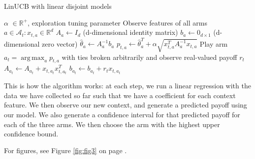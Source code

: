 \documentclass[nojss]{jss}\usepackage[]{graphicx}\usepackage[]{color}
\DeclareMathOperator*{\argmax}{arg\,max}
\begin{document}
\begin{algorithm}
\caption{LinUCB with linear disjoint models}
\label{Alg:LinUCBDisjoint}
\begin{algorithmic}
\REQUIRE $\alpha$ \(  \in \mathbb{R}^{+} \), exploration tuning parameter
          \STATE Observe features of all arms \(  a \in \mathcal{A}_{t}: x_{t,a} \in \mathbb{R}^{d}\)
		      \STATE \(A_{a} \leftarrow I_{d}  \)  (d-dimensional identity matrix)
		      \STATE \(b_{a} \leftarrow 0_{d\times1}   \) (d-dimensional zero vector)
		\ENDIF
		\STATE \( \hat{\theta}_{a} \leftarrow A_{a}^{-1}b_{a} \)
		\STATE \( p_{t,a} \leftarrow \hat{\theta}_{a}^{T} + \alpha  \sqrt{ x_{t,a}^{T} A_{a}^{-1}x_{t,a}} \)
	\ENDFOR
	\STATE Play arm \(a_t = \argmax_a  p_{t,a}  \) with ties broken arbitrarily and observe real-valued payoff $r_t$
           \STATE \( A_{a_{t}} \leftarrow A_{a_{t}}+ x_{t,a_{t}}x_{t,a_{t}}^{T} \)
           \STATE  \( b_{a_{t}} \leftarrow b_{a_{t}}+ r_{t}x_{t,a_{t}}  \)
\ENDFOR
\end{algorithmic}
\end{algorithm}

This is how the algorithm works: at each step, we run a linear regression with the data we have collected so far such that we have a coefficient for each context feature. We then observe our new context, and generate a predicted payoff using our model. We also generate a confidence interval for that predicted payoff for each of the three arms. We then choose the arm with the highest upper confidence bound.

For figures, see Figure \ref{fig:fig3} on page \pageref{fig:fig3}.
\end{document}
